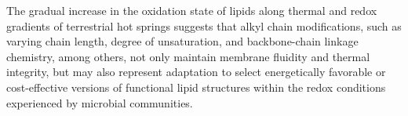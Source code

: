 The gradual increase in the oxidation state of lipids along thermal and redox gradients of terrestrial hot springs suggests that alkyl chain modifications, such as varying chain length, degree of unsaturation, and backbone-chain linkage chemistry, among others, not only maintain membrane fluidity and thermal integrity, but may also represent adaptation to select energetically favorable or cost-effective versions of functional lipid structures within the redox conditions experienced by microbial communities.










